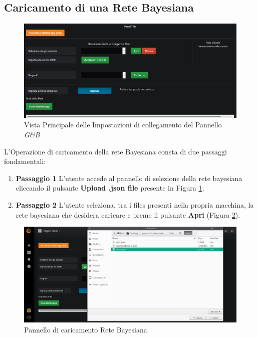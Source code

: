 \subsection{Caricamento di una Rete Bayesiana}\label{ReteB}

\begin{figure}[H]
	\begin{center}
		\includegraphics[scale=0.4]{./images/Panel.png}
		 \caption{Vista Principale delle Impostazioni di collegamento del Pannello \textit{G\&B}}	
		 \label{Pannello}
	\end{center}
\end{figure}

L'Operazione di caricamento della rete Bayesiana consta di due passaggi fondamentali:
\begin{enumerate}
	\item \textbf{Passaggio 1} L'utente accede al pannello di selezione della rete bayesiana cliccando il pulsante \textbf{Upload .json file} presente in Figura \ref{Pannello};
	\item \textbf{Passaggio 2} L'utente seleziona, tra i files presenti nella propria macchina, la rete bayesiana che desidera caricare e preme il pulsante \textbf{Apri} (Figura \ref{UploadRete}).
\end{enumerate} 

\begin{figure}[H]
	\begin{center}
		\includegraphics[scale=0.3]{./images/UpRete.png}
		 \caption{Pannello di caricamento Rete Bayesiana}	
		 \label{UploadRete}
	\end{center}
\end{figure}

